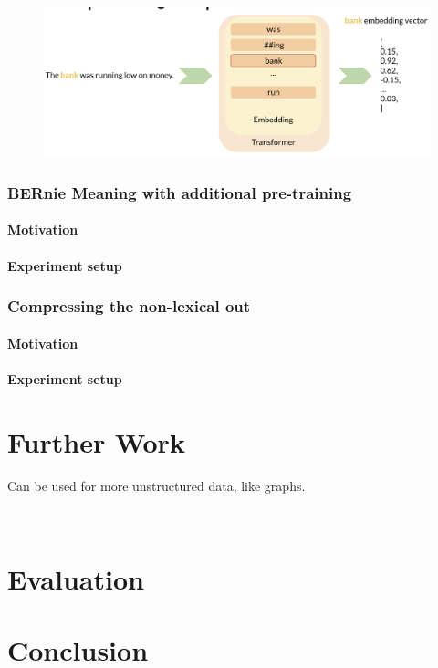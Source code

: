 \documentclass[a4paper,12pt,twoside,openright]{report}
\begin{document}
\begin{figure}[h]
	\center
  \includegraphics[width=\linewidth]{./assets/experiments/pipeline_tokenizer_BERnie_meaning_.png}
  \caption{}
  \label{fig:cbow_skipgram}
\end{figure}


\subsection{BERnie Meaning with additional pre-training}
\subsubsection{Motivation}
\subsubsection{Experiment setup}

\subsection{Compressing the non-lexical out}
\subsubsection{Motivation}
\subsubsection{Experiment setup}

\chapter{Further Work}

Can be used for more unstructured data, like graphs.

\
\chapter{Evaluation}

\chapter{Conclusion}

\appendix
\singlespacing

 
 
\end{document}
